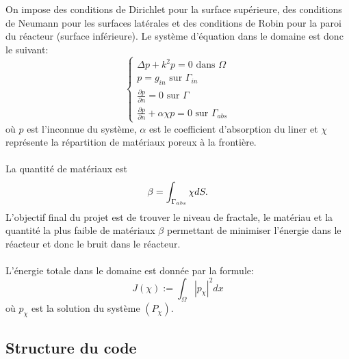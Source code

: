 On impose des conditions de Dirichlet pour la surface supérieure, des conditions de Neumann pour les surfaces latérales et des conditions de Robin pour la paroi du réacteur (surface inférieure). Le système d'équation dans le domaine est donc le suivant:
\begin{equation}
    \tag{$P_\chi$}
    \begin{cases}
    \Delta p + k^2 p = 0 \text{ dans } \Omega \\
    p = g_{in} \text{ sur } \Gamma_{in} \\
    \displaystyle \frac{\partial p}{\partial n} = 0 \text{ sur } \Gamma \\[5pt]
    \displaystyle \frac{\partial p}{\partial n} + \alpha \chi p = 0 \text{ sur } \Gamma_{abs}
    \end{cases} 
\end{equation}
où $p$ est l'inconnue du système, $\alpha$ est le coefficient d'absorption du liner et $\chi$ représente la répartition de matériaux poreux à la frontière. \\ \\
La quantité de matériaux est $$\beta = \displaystyle \displaystyle \int_{\Gamma_{abs}}\chi dS.$$
L'objectif final du projet est de trouver le niveau de fractale, le matériau et la quantité la plus faible de matériaux $\beta$ permettant de minimiser l'énergie dans le réacteur et donc le bruit dans le réacteur. \\ \\
L'énergie totale dans le domaine est donnée par la formule:
$$J(\chi) := \int_\Omega |p_\chi|^2dx$$
où $p_\chi$ est la solution du système $(P_\chi)$.

\subsection{Structure du code}


